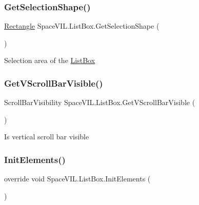 \subsubsection{\texorpdfstring{Get\+Selection\+Shape()}{GetSelectionShape()}}
{\footnotesize\ttfamily \mbox{\hyperlink{class_space_v_i_l_1_1_rectangle}{Rectangle}} Space\+V\+I\+L.\+List\+Box.\+Get\+Selection\+Shape (\begin{DoxyParamCaption}{ }\end{DoxyParamCaption})}



Selection area of the \mbox{\hyperlink{class_space_v_i_l_1_1_list_box}{List\+Box}} 

\mbox{\label{class_space_v_i_l_1_1_list_box_a73be8ba2a9a2ec0556795defb6c5ae61}} 
\subsubsection{\texorpdfstring{Get\+V\+Scroll\+Bar\+Visible()}{GetVScrollBarVisible()}}
{\footnotesize\ttfamily Scroll\+Bar\+Visibility Space\+V\+I\+L.\+List\+Box.\+Get\+V\+Scroll\+Bar\+Visible (\begin{DoxyParamCaption}{ }\end{DoxyParamCaption})}



Is vertical scroll bar visible 

\mbox{\label{class_space_v_i_l_1_1_list_box_a6fd8d4f254ff3954eb217cda21ebca45}} 
\subsubsection{\texorpdfstring{Init\+Elements()}{InitElements()}}
{\footnotesize\ttfamily override void Space\+V\+I\+L.\+List\+Box.\+Init\+Elements (\begin{DoxyParamCaption}{ }\end{DoxyParamCaption})\hspace{0.3cm}{\ttfamily [virtual]}}



